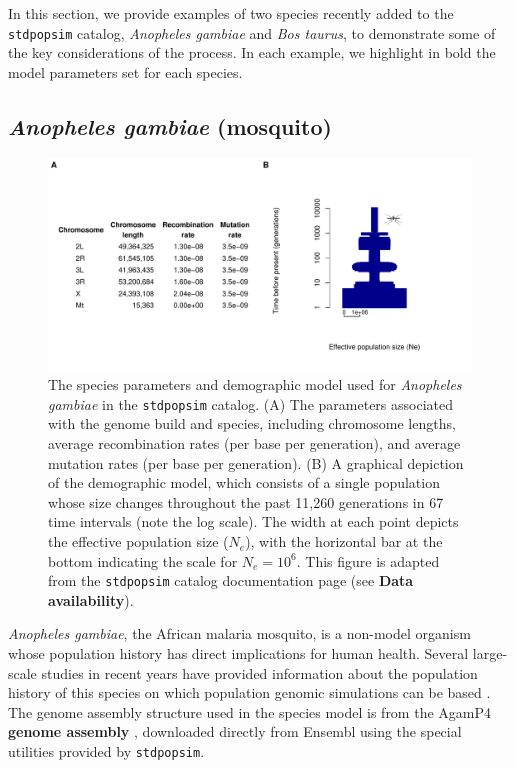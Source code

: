 \documentclass[hidelinks]{article}
\newcommand{\stdpopsim}{\texttt{stdpopsim}\xspace}
\begin{document}
In this section, we provide examples of two species recently added to the \stdpopsim catalog,
\textit{Anopheles gambiae} and \textit{Bos taurus},
to demonstrate some of the key considerations of the process.
In each example, we highlight in bold the model parameters set for each species.

\subsection*{\texorpdfstring{\emph{Anopheles gambiae} (mosquito)}{Anopheles gambiae (mosquito)}}
    \label{AnoGam}
    
\begin{figure}[b!]
	\includegraphics[width=\linewidth]{figs/anogam_demog_table}
	\caption{The species parameters and demographic model used for \emph{Anopheles gambiae} in the \stdpopsim catalog.
	(A) The parameters associated with the genome build and species, including
	chromosome lengths, average recombination rates (per base per generation),
	and average mutation rates (per base per generation).
	(B) A graphical depiction of the demographic model,
	which consists of a single population whose size changes throughout the past 11,260 generations in 67 time intervals (note the log scale). The width at each point depicts the effective population size ($N_e$), with the horizontal bar at the bottom indicating the scale for $N_e=10^6$.
	This figure is adapted from the \stdpopsim catalog documentation page (see {\bf Data availability}).
		\label{fig:anogam} }
\end{figure}


\emph{Anopheles gambiae}, the African malaria mosquito, is 
a non-model organism whose population history has direct implications for human health.
Several large-scale studies in recent years have provided information about the
population history of this species on which population genomic simulations can be based \citep[e.g.,][]{Miles2017, clarkson2020genome}.
The genome assembly structure used in the species model is from
the AgamP4 \textbf{genome assembly} \citep{Sharakhova2007},
downloaded directly from Ensembl \citep{ensembl2021}
using the special utilities provided by \stdpopsim.
\end{document}
